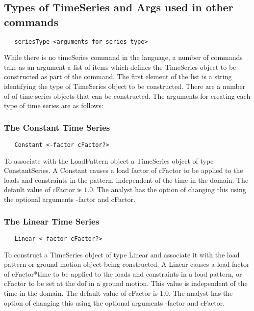 \documentclass[12pt]{article}
\begin{document}
\subsection{Types of TimeSeries and Args used in other commands}

{\sf\small
\begin{verbatim}
   seriesType <arguments for series type>
\end{verbatim}
}


While there is no timeSeries command in the language, a number of
commands take as an argument a list of items which defines 
the TimeSeries object to be constructed as part of the command. The
first element of the list is a string identifying the type of
TimeSeries object to be constructed. There are a number of of
time series objects that can be constructed.
The arguments for creating each type of time series are as
follows: 

\subsubsection{The Constant Time Series}

{\sf\small
\begin{verbatim}
   Constant <-factor cFactor?> 
\end{verbatim}
}

\noindent To associate with the LoadPattern object a TimeSeries object
of type ConstantSeries. A Constant causes a load factor of cFactor to
be applied to the loads and constraints in the pattern, independent of
the time in the domain. The default value of cFactor is $1.0$. The
analyst has the option of changing this using the optional arguments
-factor and cFactor. 

\subsubsection{The Linear Time Series}

{\sf\small
\begin{verbatim}
   Linear <-factor cFactor?> 
\end{verbatim}
}

   
\noindent  To construct a TimeSeries object of type Linear and associate it with the load pattern or ground motion object being constructed. A Linear causes a load factor of cFactor*time to be applied to the loads and constraints in a load pattern, or cFactor to be set at the dof in a ground motion. This value is independent of the time in the domain. The default value of cFactor is $1.0$. The analyst has the option of changing this using the optional arguments
-factor and cFactor. 
\end{document}
